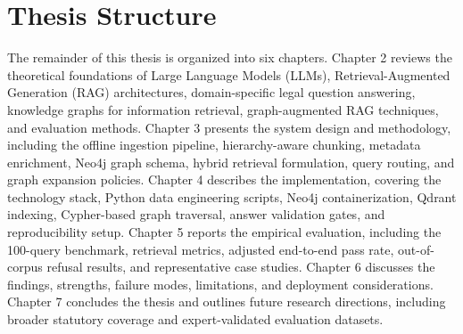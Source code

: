 \section{Thesis Structure}
The remainder of this thesis is organized into six chapters. Chapter 2 reviews the theoretical foundations of Large Language Models (LLMs), Retrieval-Augmented Generation (RAG) architectures, domain-specific legal question answering, knowledge graphs for information retrieval, graph-augmented RAG techniques, and evaluation methods. Chapter 3 presents the system design and methodology, including the offline ingestion pipeline, hierarchy-aware chunking, metadata enrichment, Neo4j graph schema, hybrid retrieval formulation, query routing, and graph expansion policies. Chapter 4 describes the implementation, covering the technology stack, Python data engineering scripts, Neo4j containerization, Qdrant indexing, Cypher-based graph traversal, answer validation gates, and reproducibility setup. Chapter 5 reports the empirical evaluation, including the 100-query benchmark, retrieval metrics, adjusted end-to-end pass rate, out-of-corpus refusal results, and representative case studies. Chapter 6 discusses the findings, strengths, failure modes, limitations, and deployment considerations. Chapter 7 concludes the thesis and outlines future research directions, including broader statutory coverage and expert-validated evaluation datasets.
